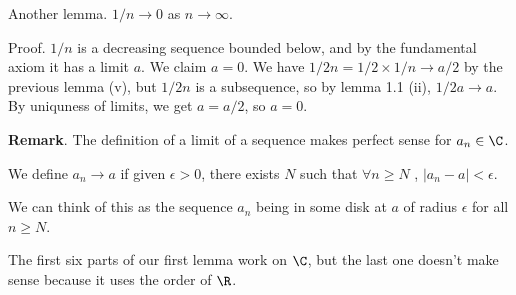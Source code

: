 \documentclass[a4paper]{scrreprt}
\begin{document}
Another lemma. $1/n \rightarrow 0$ as $n \rightarrow \infty$.

Proof. $1/n$ is a decreasing sequence bounded below, and by the fundamental axiom it has a limit $a$. We claim $a = 0$. We have
$1/2n = 1/2 \times 1/n \rightarrow a/2$ by the previous lemma (v), but $1/2n$ is a subsequence, so by lemma 1.1 (ii), $1/2a \rightarrow a$. By uniquness of limits, we get $a = a/2$, so $a = 0$.


\textbf{Remark}. The definition of a limit of a sequence makes perfect sense for $a_n \in \C$.

We define $a_n \rightarrow a$ if given $\epsilon > 0$, there exists $N$ such that $\forall n \geq N$
, $|a_n - a| < \epsilon$.

We can think of this as the sequence $a_n$ being in some disk at $a$ of radius $\epsilon$ for all $n \geq N$.

The first six parts of our first lemma work on $\C$, but the last one doesn't make sense because it uses the order of $\R$.
\end{document}
